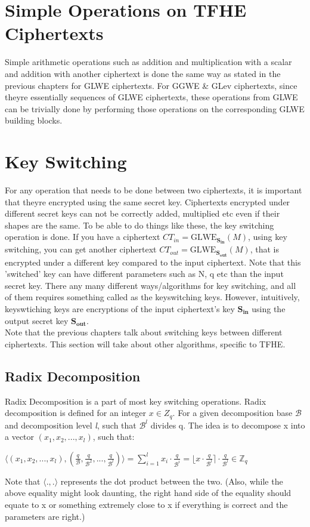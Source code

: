 \documentclass{report}
\begin{document}
\section{Simple Operations on TFHE Ciphertexts}
Simple arithmetic operations such as addition and multiplication with a scalar and addition with another ciphertext is done the same way as stated in the previous chapters for GLWE ciphertexts. For GGWE \& GLev ciphertexts, since theyre essentially sequences of GLWE ciphertexts, these operations from GLWE can be trivially done by performing those operations on the corresponding GLWE building blocks.

\section{Key Switching}
For any operation that needs to be done between two ciphertexts, it is important that theyre encrypted using the same secret key. Ciphertexts encrypted under different secret keys can not be correctly added, multiplied etc even if their shapes are the same. To be able to do things like these, the key switching operation is done. If you have a ciphertext $CT_{in} = \text{GLWE}_{\mathbf{S_{in}}}(M)$, using key switching, you can get another ciphertext $CT_{out} = \text{GLWE}_\mathbf{S_{out}}(M)$, that is encrypted under a different key compared to the input ciphertext. Note that this 'switched' key can have different parameters such as N, q etc than the input secret key. There any many different ways/algorithms for key switching, and all of them requires something called as the keyswitching keys. However, intuitively, keyswtiching keys are encryptions of the input ciphertext's key $\mathbf{S_{in}}$ using the output secret key $\mathbf{S_{out}}$.\\
Note that the previous chapters talk about switching keys between different ciphertexts. This section will take about other algorithms, specific to TFHE.

\subsection{Radix Decomposition}
Radix Decomposition is a part of most key switching operations. Radix decomposition is defined for an integer $x \in Z_q$. For a given decomposition base $\mathcal{B}$ and decomposition level \textit{l}, such that $\mathcal{B}^\mathit{l}$ divides q. The idea is to decompose x into a vector $(x_1, x_2, ..., x_l)$, such that:
\begin{center}
	$\langle (x_1, x_2, ..., x_l), (\frac{q}{\mathcal{B}}, \frac{q}{\mathcal{B}^2}, ..., \frac{q}{\mathcal{B}^\mathit{l}}) \rangle = \sum\limits_{i=1}^{\mathit{l}} x_i \cdot \frac{q}{\mathcal{B}^i} = \lfloor x \cdot \frac{q}{\mathcal{B}^\mathit{l}} \rceil \cdot \frac{q}{\mathcal{B}^\mathit{l}} \in \mathbb{Z}_q$
\end{center}
Note that $\langle ., . \rangle$ represents the dot product between the two. (Also, while the above equality might look daunting, the right hand side of the equality should equate to x or something extremely close to x if everything is correct and the parameters are right.)
\end{document}
